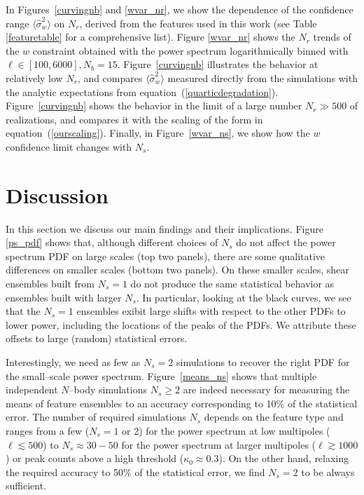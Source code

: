 \documentclass[reprint,aps,prd,superscriptaddress,showkeys,showpacs]{revtex4-1}
\newcommand{\h}[1]{\hat{#1}}
\begin{document}
In Figures~\ref{curvingnb} and \ref{wvar_nr}, we show the dependence
of the confidence range $\langle\h{\sigma}^2_w\rangle$ on $N_r$,
derived from the features used in this work (see Table
\ref{featuretable} for a comprehensive list). Figure \ref{wvar_nr}
shows the $N_r$ trends of the $w$ constraint obtained with the power
spectrum logarithmically binned with $\ell\in[100,6000], N_b=15$.
Figure~\ref{curvingnb} illustrates the behavior at relatively low
$N_r$, and compares $\langle\h{\sigma}^2_w\rangle$ measured directly
from the simulations with the analytic expectations from
equation~(\ref{quarticdegradation}).  Figure~\ref{curvingnb} shows the
behavior in the limit of a large number $N_r\gg500$ of realizations,
and compares it with the scaling of the form in
equation~(\ref{ourscaling}). Finally, in Figure~\ref{wvar_ns}, we show
how the $w$ confidence limit changes with $N_s$.


\section{Discussion}

In this section we discuss our main findings and their
implications. Figure \ref{ps_pdf} shows that, although different
choices of $N_s$ do not affect the power spectrum PDF on large scales
(top two panels), there are some qualitative differences on smaller
scales (bottom two panels). On these smaller scales, shear ensembles
built from $N_s=1$ do not produce the same statistical behavior as
ensembles built with larger $N_s$. In particular, looking at the black
curves, we see that the $N_s=1$ ensembles exibit large shifts with
respect to the other PDFs to lower power, including the locations of
the peaks of the PDFs.  We attribute these offsets to large (random)
statistical errors.

Interestingly, we need as few as $N_s=2$ simulations to recover the
right PDF for the small--scale power spectrum.  Figure~\ref{means_ns}
shows that multiple independent $N$--body simulations $N_s\geq2$ are
indeed necessary for measuring the means of feature ensembles to an
accuracy corresponding to 10\% of the statistical error. The number of
required simulations $N_s$ depends on the feature type and ranges from
a few ($N_s=1$ or 2) for the power spectrum at low multipoles
($\ell\lesssim 500$) to $N_s\approx 30-50$ for the power spectrum at
larger multipoles ($\ell\gtrsim1000$) or peak counts above a high
threshold ($\kappa_0\approx0.3$).  On the other hand, relaxing the
required accuracy to 50\% of the statistical error, we find $N_s=2$ to
be always sufficient.
\end{document}
